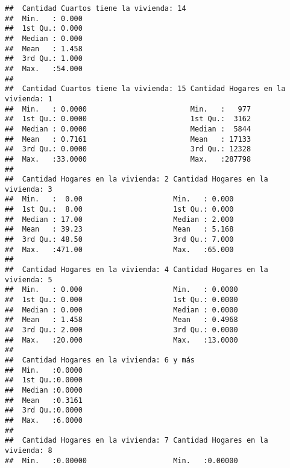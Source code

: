 \documentclass[11pt,]{article}
\begin{document}
\begin{verbatim}
##  Cantidad Cuartos tiene la vivienda: 14
##  Min.   : 0.000                        
##  1st Qu.: 0.000                        
##  Median : 0.000                        
##  Mean   : 1.458                        
##  3rd Qu.: 1.000                        
##  Max.   :54.000                        
##                                        
##  Cantidad Cuartos tiene la vivienda: 15 Cantidad Hogares en la vivienda: 1
##  Min.   : 0.0000                        Min.   :   977                    
##  1st Qu.: 0.0000                        1st Qu.:  3162                    
##  Median : 0.0000                        Median :  5844                    
##  Mean   : 0.7161                        Mean   : 17133                    
##  3rd Qu.: 0.0000                        3rd Qu.: 12328                    
##  Max.   :33.0000                        Max.   :287798                    
##                                                                           
##  Cantidad Hogares en la vivienda: 2 Cantidad Hogares en la vivienda: 3
##  Min.   :  0.00                     Min.   : 0.000                    
##  1st Qu.:  8.00                     1st Qu.: 0.000                    
##  Median : 17.00                     Median : 2.000                    
##  Mean   : 39.23                     Mean   : 5.168                    
##  3rd Qu.: 48.50                     3rd Qu.: 7.000                    
##  Max.   :471.00                     Max.   :65.000                    
##                                                                       
##  Cantidad Hogares en la vivienda: 4 Cantidad Hogares en la vivienda: 5
##  Min.   : 0.000                     Min.   : 0.0000                   
##  1st Qu.: 0.000                     1st Qu.: 0.0000                   
##  Median : 0.000                     Median : 0.0000                   
##  Mean   : 1.458                     Mean   : 0.4968                   
##  3rd Qu.: 2.000                     3rd Qu.: 0.0000                   
##  Max.   :20.000                     Max.   :13.0000                   
##                                                                       
##  Cantidad Hogares en la vivienda: 6 y más
##  Min.   :0.0000                          
##  1st Qu.:0.0000                          
##  Median :0.0000                          
##  Mean   :0.3161                          
##  3rd Qu.:0.0000                          
##  Max.   :6.0000                          
##                                          
##  Cantidad Hogares en la vivienda: 7 Cantidad Hogares en la vivienda: 8
##  Min.   :0.00000                    Min.   :0.00000                   

\end{verbatim}
\end{document}
